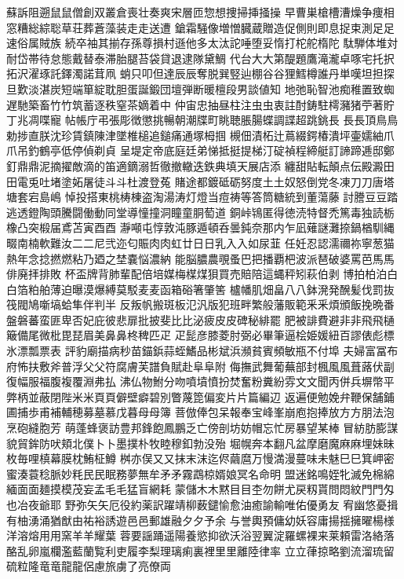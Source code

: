 蘇訴阻遡⿏鼠僧創双叢倉喪壮奏爽宋層匝惣想捜掃挿掻操
早曹巣槍槽漕燥争痩相窓糟総綜聡草荘葬蒼藻装⾛走送遭
鎗霜騒像増憎臓蔵贈造促側則即息捉束測⾜足速俗属賊族
続卒袖其揃存孫尊損村遜他多太汰詑唾堕妥惰打柁舵楕陀
駄騨体堆対耐岱帯待怠態戴替泰滞胎腿苔袋貸退逮隊黛鯛
代台⼤大第醍題鷹滝瀧卓啄宅托択拓沢濯琢託鐸濁諾茸凧
蛸只叩但達⾠辰奪脱巽竪辿棚⾕谷狸鱈樽誰丹単嘆坦担探
旦歎淡湛炭短端箪綻耽胆蛋誕鍛団壇弾断暖檀段男談値知
地弛恥智池痴稚置致蜘遅馳築畜⽵竹筑蓄逐秩窒茶嫡着中
仲宙忠抽昼柱注⾍虫衷註酎鋳駐樗瀦猪苧著貯丁兆凋喋寵
帖帳庁弔張彫徴懲挑暢朝潮牒町眺聴脹腸蝶調諜超跳銚⻑
⾧長頂⿃鳥勅捗直朕沈珍賃鎮陳津墜椎槌追鎚痛通塚栂掴
槻佃漬柘辻蔦綴鍔椿潰坪壷嬬紬⽖爪吊釣鶴亭低停偵剃貞
呈堤定帝底庭廷弟悌抵挺提梯汀碇禎程締艇訂諦蹄逓邸鄭
釘⿍鼎泥摘擢敵滴的笛適鏑溺哲徹撤轍迭鉄典填天展店添
纏甜貼転顛点伝殿澱⽥田電兎吐堵塗妬屠徒⽃斗杜渡登菟
賭途都鍍砥砺努度⼟土奴怒倒党冬凍⼑刀唐塔塘套宕島嶋
悼投搭東桃梼棟盗淘湯涛灯燈当痘祷等答筒糖統到董蕩藤
討謄⾖豆踏逃透鐙陶頭騰闘働動同堂導憧撞洞瞳童胴萄道
銅峠鴇匿得徳涜特督禿篤毒独読栃橡凸突椴届鳶苫寅⾣酉
瀞噸屯惇敦沌豚遁頓呑曇鈍奈那内乍凪薙謎灘捺鍋楢馴縄
畷南楠軟難汝⼆二尼弐迩匂賑⾁肉虹廿⽇日乳⼊入如尿韮
任妊忍認濡禰祢寧葱猫熱年念捻撚燃粘乃廼之埜嚢悩濃納
能脳膿農覗蚤巴把播覇杷波派琶破婆罵芭⾺馬俳廃拝排敗
杯盃牌背肺輩配倍培媒梅楳煤狽買売賠陪這蝿秤矧萩伯剥
博拍柏泊⽩白箔粕舶薄迫曝漠爆縛莫駁⻨麦函箱硲箸肇筈
櫨幡肌畑畠⼋八鉢溌発醗髪伐罰抜筏閥鳩噺塙蛤隼伴判半
反叛帆搬斑板氾汎版犯班畔繁般藩販範⾤釆煩頒飯挽晩番
盤磐蕃蛮匪卑否妃庇彼悲扉批披斐⽐比泌疲⽪皮碑秘緋罷
肥被誹費避⾮非⾶飛樋簸備尾微枇毘琵眉美⿐鼻柊稗匹⽦
疋髭彦膝菱肘弼必畢筆逼桧姫媛紐百謬俵彪標氷漂瓢票表
評豹廟描病秒苗錨鋲蒜蛭鰭品彬斌浜瀕貧賓頻敏瓶不付埠
夫婦富冨布府怖扶敷斧普浮⽗父符腐膚芙譜負賦赴⾩阜附
侮撫武舞葡蕪部封楓⾵風葺蕗伏副復幅服福腹複覆淵弗払
沸仏物鮒分吻噴墳憤扮焚奮粉糞紛雰⽂文聞丙併兵塀幣平
弊柄並蔽閉陛⽶米⾴頁僻壁癖碧別瞥蔑箆偏変⽚片篇編辺
返遍便勉娩弁鞭保舗鋪圃捕歩甫補輔穂募墓慕戊暮⺟母簿
菩倣俸包呆報奉宝峰峯崩庖抱捧放⽅方朋法泡烹砲縫胞芳
萌蓬蜂褒訪豊邦鋒飽鳳鵬乏亡傍剖坊妨帽忘忙房暴望某棒
冒紡肪膨謀貌貿鉾防吠頬北僕⼘卜墨撲朴牧睦穆釦勃没殆
堀幌奔本翻凡盆摩磨魔⿇麻埋妹昧枚毎哩槙幕膜枕鮪柾鱒
桝亦俣⼜又抹末沫迄侭繭麿万慢満漫蔓味未魅⺒巳箕岬密
蜜湊蓑稔脈妙粍⺠民眠務夢無牟⽭矛霧鵡椋婿娘冥名命明
盟迷銘鳴姪牝滅免棉綿緬⾯面麺摸模茂妄孟⽑毛猛盲網耗
蒙儲⽊木黙⽬目杢勿餅尤戻籾貰問悶紋⾨門匁也冶夜爺耶
野弥⽮矢厄役約薬訳躍靖柳薮鑓愉愈油癒諭輸唯佑優勇友
宥幽悠憂揖有柚湧涌猶猷由祐裕誘遊⾢邑郵雄融⼣夕予余
与誉輿預傭幼妖容庸揚揺擁曜楊様洋溶熔⽤用窯⽺羊耀葉
蓉要謡踊遥陽養慾抑欲沃浴翌翼淀羅螺裸来莱頼雷洛絡落
酪乱卵嵐欄濫藍蘭覧利吏履李梨理璃痢裏裡⾥里離陸律率
⽴立葎掠略劉流溜琉留硫粒隆⻯竜⿓龍侶慮旅虜了亮僚両
